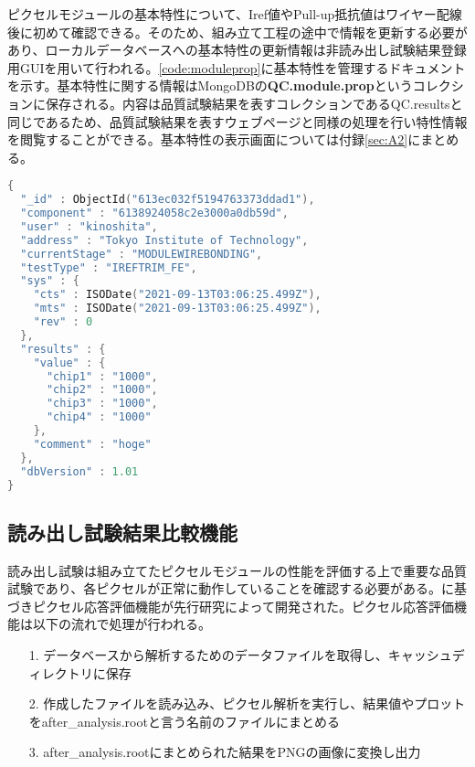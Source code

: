 ピクセルモジュールの基本特性について、Iref値やPull-up抵抗値はワイヤー配線後に初めて確認できる。そのため、組み立て工程の途中で情報を更新する必要があり、ローカルデータベースへの基本特性の更新情報は非読み出し試験結果登録用GUIを用いて行われる。\cref{code:moduleprop}に基本特性を管理するドキュメントを示す。基本特性に関する情報はMongoDBの\textbf{QC.module.prop}というコレクションに保存される。内容は品質試験結果を表すコレクションであるQC.resultsと同じであるため、品質試験結果を表すウェブページと同様の処理を行い特性情報を閲覧することができる。基本特性の表示画面については付録\ref{sec:A2}にまとめる。

\begin{lstlisting}[caption=ピクセルモジュールの基本特定更新情報を表すドキュメント。,label=code:moduleprop, language=C++]
{
  "_id" : ObjectId("613ec032f5194763373ddad1"),
  "component" : "6138924058c2e3000a0db59d",
  "user" : "kinoshita",
  "address" : "Tokyo Institute of Technology",
  "currentStage" : "MODULEWIREBONDING",
  "testType" : "IREFTRIM_FE",
  "sys" : {
    "cts" : ISODate("2021-09-13T03:06:25.499Z"),
    "mts" : ISODate("2021-09-13T03:06:25.499Z"),
    "rev" : 0
  },
  "results" : {
    "value" : {
      "chip1" : "1000",
      "chip2" : "1000",
      "chip3" : "1000",
      "chip4" : "1000"
    },
    "comment" : "hoge"
  },
  "dbVersion" : 1.01
}
\end{lstlisting}

\subsection{読み出し試験結果比較機能}
\label{sec:elec-hikaku}

読み出し試験は組み立てたピクセルモジュールの性能を評価する上で重要な品質試験であり、各ピクセルが正常に動作していることを確認する必要がある。に基づきピクセル応答評価機能が先行研究\cite{oku}によって開発された。ピクセル応答評価機能は以下の流れで処理が行われる。
\begin{itemize}
  \item[1. ] データベースから解析するためのデータファイルを取得し、キャッシュディレクトリに保存
  \item[2. ] 作成したファイルを読み込み、ピクセル解析を実行し、結果値やプロットをafter\_analysis.rootと言う名前のファイルにまとめる
  \item[3. ] after\_analysis.rootにまとめられた結果をPNGの画像に変換し出力
\end{itemize}

